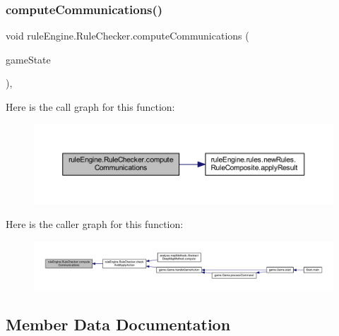 \subsubsection{\texorpdfstring{compute\+Communications()}{computeCommunications()}}
{\footnotesize\ttfamily void rule\+Engine.\+Rule\+Checker.\+compute\+Communications (\begin{DoxyParamCaption}\item[{\mbox{\hyperlink{classgame_1_1game_state_1_1_game_state}{Game\+State}}}]{game\+State }\end{DoxyParamCaption})\hspace{0.3cm}{\ttfamily [inline]}, {\ttfamily [private]}}

Here is the call graph for this function\+:
\nopagebreak
\begin{figure}[H]
\begin{center}
\leavevmode
\includegraphics[width=350pt]{classrule_engine_1_1_rule_checker_a271924d22d328a894f36885c6d7f3833_cgraph}
\end{center}
\end{figure}
Here is the caller graph for this function\+:
\nopagebreak
\begin{figure}[H]
\begin{center}
\leavevmode
\includegraphics[width=350pt]{classrule_engine_1_1_rule_checker_a271924d22d328a894f36885c6d7f3833_icgraph}
\end{center}
\end{figure}


\subsection{Member Data Documentation}
\mbox{\label{classrule_engine_1_1_rule_checker_ac6422d6a1adb7c31883648d38467bbee}} 
